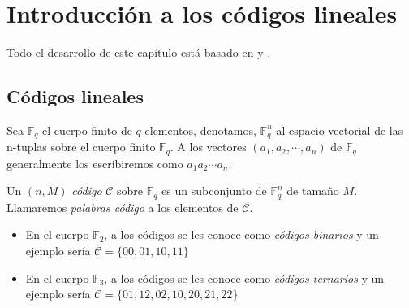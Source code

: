 










\chapter{Introducción a los códigos lineales}

Todo el desarrollo de este capítulo está basado en \cite{Huffman_Pless_2010} y \cite{Wassermann_2006} .
\section{Códigos lineales}

Sea $\mathbb{F}_q$ el cuerpo finito de $q$ elementos, denotamos, $\mathbb{F}_q^n$ al espacio vectorial de las n-tuplas sobre el cuerpo finito $\mathbb{F}_q$. A los vectores $(a_1,a_2,\cdots,a_n)$ de $\mathbb{F}_q$ generalmente los escribiremos como $a_1a_2\cdots a_n$.



\begin{definition}
Un $(n,M)$ \emph{código} $\mathcal{C}$ sobre $\mathbb{F}_q$ es un subconjunto de $\mathbb{F}_q^n$ de tamaño $M$. Llamaremos \emph{palabras código} a los elementos de $\mathcal{C}$.
\end{definition}

\begin{exampleth}
\begin{itemize}
	\item En el cuerpo $\mathbb{F}_2$, a los códigos se les conoce como \emph{códigos binarios} y un ejemplo sería $\mathcal{C} = \{00,01,10,11\}$

	\item En el cuerpo $\mathbb{F}_3$, a los códigos se les conoce como \emph{códigos ternarios} y un ejemplo sería $\mathcal{C} = \{01, 12, 02, 10, 20, 21, 22\}$
\end{itemize}
\end{exampleth}

